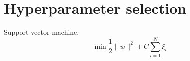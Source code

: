 \section{Hyperparameter selection}

Support vector machine.
\[
\min \frac{1}{2} \|w\|^2 + C \sum_{i=1}^N \xi_i
\]

